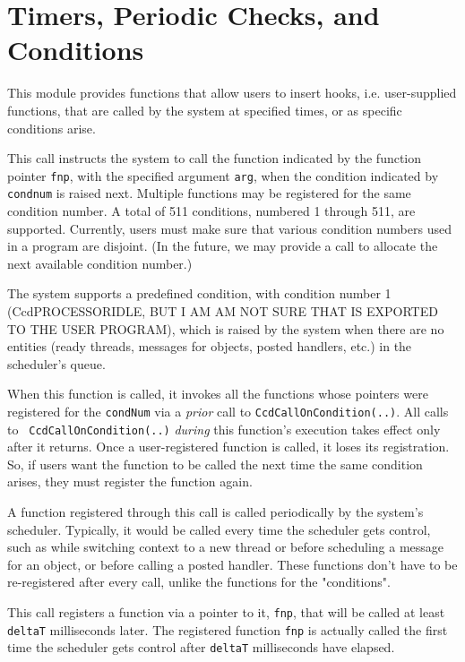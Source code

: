 

\chapter{Timers, Periodic Checks, and Conditions}

This module provides functions that allow users to insert hooks,
i.e. user-supplied functions, that are called by the system at
specified times, or as specific conditions arise.


This call instructs the system to call the function indicated by the
function pointer {\tt fnp}, with the specified argument {\tt arg}, when the
condition indicated by {\tt condnum} is raised next. Multiple functions may
be registered for the same condition number. A total of 511
conditions, numbered 1 through 511, are supported.  Currently, users
must make sure that various condition numbers used in a program are
disjoint.  (In the future, we may provide a call to allocate the next
available condition number.)

The system supports a predefined condition, with condition number 1
(CcdPROCESSORIDLE, BUT I AM AM NOT SURE THAT IS EXPORTED TO THE USER
PROGRAM), which is raised by the system when there are no entities
(ready threads, messages for objects, posted handlers, etc.) in the
scheduler's queue.


When this function is called, it invokes all the functions whose
pointers were registered for the \verb#condNum# via a {\em prior} call
to {\tt CcdCallOnCondition(..)}.  All calls to {\tt
CcdCallOnCondition(..)} {\em during} this function's execution takes
effect only after it returns.  Once a user-registered
function is called, it loses its registration.  So, if users want the
function to be called the next time the same condition arises, they
must register the function again.


A function registered through this call is called periodically by the
system's scheduler.  Typically, it would be called every time the
scheduler gets control, such as while switching context to a new
thread or before scheduling a message for an object, or before calling
a posted handler. These functions don't have to be re-registered after
every call, unlike the functions for the "conditions". 


This call registers a function via a pointer to it, {\tt fnp},  that will be
called at least {\tt deltaT} milliseconds later. 
The registered function {\tt fnp} is actually called the first time the
scheduler gets control after {\tt deltaT} milliseconds have elapsed. 

